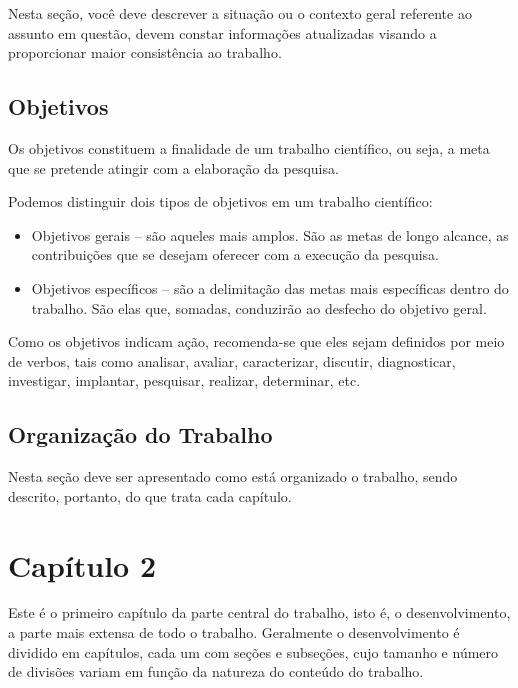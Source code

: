\documentclass[
	12pt,			%
	openright,		%
	oneside,	
	a4paper,		%
	english,		%
	brazil			%
]{abntex2/abntex2}  %
\begin{document}
		Nesta seção, você deve descrever a situação ou o contexto geral referente ao
		assunto em questão, devem constar informações atualizadas visando a
		proporcionar maior consistência ao trabalho.

	\section{Objetivos}

		Os objetivos constituem a finalidade de um trabalho científico, ou seja, a
		meta que se pretende atingir com a elaboração da pesquisa.
		
		Podemos distinguir dois tipos de objetivos em um trabalho científico:
		
		\begin{itemize}
			\item Objetivos gerais – são aqueles mais amplos. São as metas de longo alcance, as contribuições que se desejam oferecer com a execução da pesquisa.

			\item Objetivos específicos – são a delimitação das metas mais específicas dentro do trabalho. São elas que, somadas, conduzirão ao desfecho do objetivo geral.
		\end{itemize}
		
		Como os objetivos indicam ação, recomenda-se que eles sejam definidos por meio de verbos, tais como analisar, avaliar, caracterizar, discutir, diagnosticar, investigar, implantar, pesquisar, realizar, determinar, etc.
		
	\section{Organização do Trabalho}
	
		Nesta seção deve ser apresentado como está organizado o trabalho, sendo descrito, portanto, do que trata cada capítulo.


\chapter{Capítulo 2}

	Este é o primeiro capítulo da parte central do trabalho, isto é, o
desenvolvimento, a parte mais extensa de todo o trabalho. Geralmente o
desenvolvimento é dividido em capítulos, cada um com seções e subseções,
cujo tamanho e número de divisões variam em função da natureza do
conteúdo do trabalho.
\end{document}
